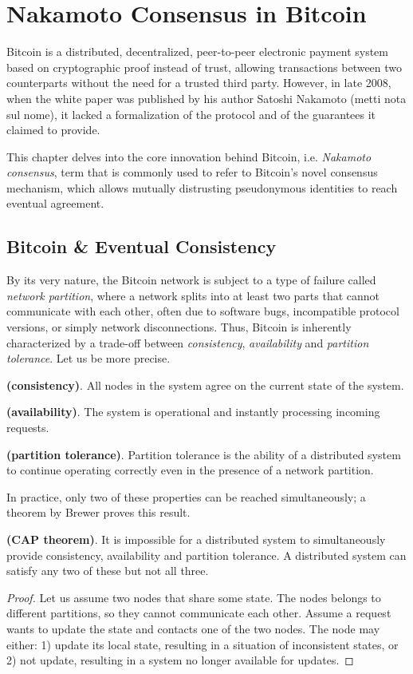 \chapter{Nakamoto Consensus in Bitcoin}
\label{chpr:btc}
Bitcoin is a distributed, decentralized, peer-to-peer electronic payment system based on cryptographic proof instead of trust, allowing transactions between two counterparts without the need for a trusted third party. However, in late 2008, when the white paper was published by his author Satoshi Nakamoto (metti nota sul nome), it lacked a formalization of the protocol and of the guarantees it claimed to provide.

\bigskip
\noindent
This chapter delves into the core innovation behind Bitcoin, i.e. \textit{Nakamoto consensus}, term that is commonly used to refer to Bitcoin's novel consensus mechanism, which allows mutually distrusting pseudonymous identities to reach eventual agreement.

\bigskip
\section{Bitcoin \& Eventual Consistency}
By its very nature, the Bitcoin network is subject to a type of failure called \textit{network partition}, where a network splits into at least two parts that cannot communicate with each other, often due to software bugs, incompatible protocol versions, or simply network disconnections.
Thus, Bitcoin is inherently characterized by a trade-off between \textit{consistency}, \textit{availability} and \textit{partition tolerance}. Let us be more precise.
\begin{mydef} {\bf (consistency)}.
    All nodes in the system agree on the current state of the system.
\end{mydef}
\begin{mydef} {\bf (availability)}.
    The system is operational and instantly processing incoming requests.
\end{mydef}
\begin{mydef} {\bf (partition tolerance)}.
    Partition tolerance is the ability of a distributed system to continue operating correctly even in the presence of a network partition.
\end{mydef}

\bigskip
\noindent
In practice, only two of these properties can be reached simultaneously; a theorem by Brewer proves this result.
\begin{thm} {\bf (CAP theorem)}.
    It is impossible for a distributed system to simultaneously provide consistency, availability and partition tolerance. A distributed system can satisfy any two of these but not all three.
\end{thm}
\begin{proof}
    Let us assume two nodes that share some state. The nodes belongs to different partitions, so they cannot communicate each other. Assume a request wants to update the state and contacts one of the two nodes. The node may either: 1) update its local state, resulting in a situation of inconsistent states, or 2) not update, resulting in a system no longer available for updates.
\end{proof}


